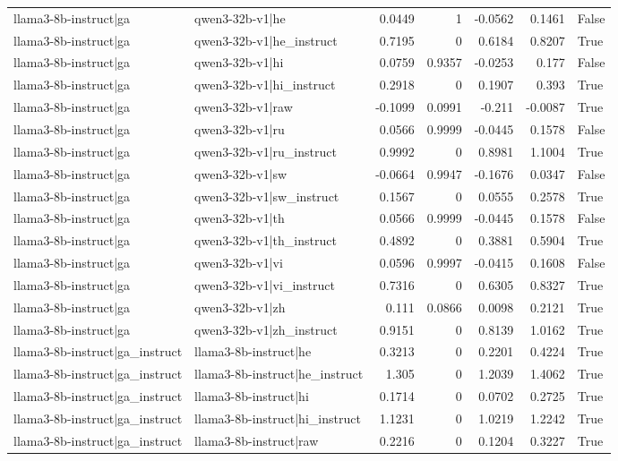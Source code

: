 \begin{table}
\begin{tabular}{l l r r r r l}
llama3-8b-instruct|ga & qwen3-32b-v1|he & 0.0449 & 1 & -0.0562 & 0.1461 & False \\
llama3-8b-instruct|ga & qwen3-32b-v1|he_instruct & 0.7195 & 0 & 0.6184 & 0.8207 & True \\
llama3-8b-instruct|ga & qwen3-32b-v1|hi & 0.0759 & 0.9357 & -0.0253 & 0.177 & False \\
llama3-8b-instruct|ga & qwen3-32b-v1|hi_instruct & 0.2918 & 0 & 0.1907 & 0.393 & True \\
llama3-8b-instruct|ga & qwen3-32b-v1|raw & -0.1099 & 0.0991 & -0.211 & -0.0087 & True \\
llama3-8b-instruct|ga & qwen3-32b-v1|ru & 0.0566 & 0.9999 & -0.0445 & 0.1578 & False \\
llama3-8b-instruct|ga & qwen3-32b-v1|ru_instruct & 0.9992 & 0 & 0.8981 & 1.1004 & True \\
llama3-8b-instruct|ga & qwen3-32b-v1|sw & -0.0664 & 0.9947 & -0.1676 & 0.0347 & False \\
llama3-8b-instruct|ga & qwen3-32b-v1|sw_instruct & 0.1567 & 0 & 0.0555 & 0.2578 & True \\
llama3-8b-instruct|ga & qwen3-32b-v1|th & 0.0566 & 0.9999 & -0.0445 & 0.1578 & False \\
llama3-8b-instruct|ga & qwen3-32b-v1|th_instruct & 0.4892 & 0 & 0.3881 & 0.5904 & True \\
llama3-8b-instruct|ga & qwen3-32b-v1|vi & 0.0596 & 0.9997 & -0.0415 & 0.1608 & False \\
llama3-8b-instruct|ga & qwen3-32b-v1|vi_instruct & 0.7316 & 0 & 0.6305 & 0.8327 & True \\
llama3-8b-instruct|ga & qwen3-32b-v1|zh & 0.111 & 0.0866 & 0.0098 & 0.2121 & True \\
llama3-8b-instruct|ga & qwen3-32b-v1|zh_instruct & 0.9151 & 0 & 0.8139 & 1.0162 & True \\
llama3-8b-instruct|ga_instruct & llama3-8b-instruct|he & 0.3213 & 0 & 0.2201 & 0.4224 & True \\
llama3-8b-instruct|ga_instruct & llama3-8b-instruct|he_instruct & 1.305 & 0 & 1.2039 & 1.4062 & True \\
llama3-8b-instruct|ga_instruct & llama3-8b-instruct|hi & 0.1714 & 0 & 0.0702 & 0.2725 & True \\
llama3-8b-instruct|ga_instruct & llama3-8b-instruct|hi_instruct & 1.1231 & 0 & 1.0219 & 1.2242 & True \\
llama3-8b-instruct|ga_instruct & llama3-8b-instruct|raw & 0.2216 & 0 & 0.1204 & 0.3227 & True \\

\end{tabular}
\end{table}
